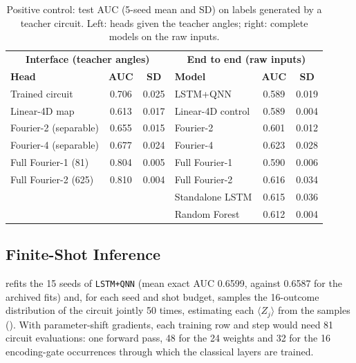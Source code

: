 \documentclass[11pt,a4paper]{article}
\begin{document}
\begin{table}[htbp]
\centering
\caption{Positive control: test AUC (5-seed mean and SD) on labels generated by a teacher circuit. Left: heads given the teacher angles; right: complete models on the raw inputs.}
\label{tab:teacher}
{\small
\begin{tabular}{lcc@{\hspace{2em}}lcc}
\toprule
\multicolumn{3}{c}{\textbf{Interface (teacher angles)}} & \multicolumn{3}{c}{\textbf{End to end (raw inputs)}} \\
\textbf{Head} & \textbf{AUC} & \textbf{SD} & \textbf{Model} & \textbf{AUC} & \textbf{SD} \\
\midrule
Trained circuit & 0.706 & 0.025 & LSTM+QNN & 0.589 & 0.019 \\
Linear-4D map & 0.613 & 0.017 & Linear-4D control & 0.589 & 0.004 \\
Fourier-2 (separable) & 0.655 & 0.015 & Fourier-2 & 0.601 & 0.012 \\
Fourier-4 (separable) & 0.677 & 0.024 & Fourier-4 & 0.623 & 0.028 \\
Full Fourier-1 (81) & 0.804 & 0.005 & Full Fourier-1 & 0.590 & 0.006 \\
Full Fourier-2 (625) & 0.810 & 0.004 & Full Fourier-2 & 0.616 & 0.034 \\
 & &  & Standalone LSTM & 0.615 & 0.036 \\
 & &  & Random Forest & 0.612 & 0.004 \\
\bottomrule
\end{tabular}}
\end{table}

\subsection{Finite-Shot Inference}
\label{app:shots}

 refits the 15 seeds of \texttt{LSTM+QNN} (mean exact AUC 0.6599, against 0.6587 for the archived fits) and, for each seed and shot budget, samples the 16-outcome distribution of the circuit jointly 50 times, estimating each $\langle Z_j\rangle$ from the samples (). With parameter-shift gradients, each training row and step would need 81 circuit evaluations: one forward pass, 48 for the 24 weights and 32 for the 16 encoding-gate occurrences through which the classical layers are trained.
\end{document}
